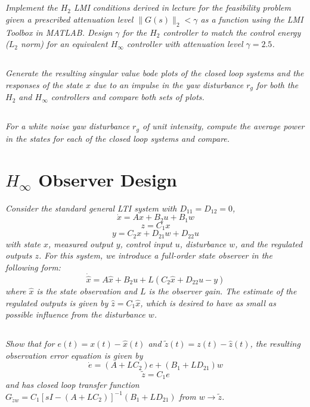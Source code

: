 \documentclass[12pt, letterpaper]{article}
\begin{document}
\subsection{}
\textit{
Implement the $H_2$ LMI conditions derived in lecture for the feasibility problem given a prescribed attenuation level $\|G(s)\|_2 < \gamma$ as a function using the LMI Toolbox in MATLAB. Design $\gamma$ for the $H_2$ controller to match the control energy ($L_2$ norm) for an equivalent $H_\infty$ controller with attenuation level $\gamma = 2.5$.
}

\subsection{}
\textit{
Generate the resulting singular value bode plots of the closed loop systems and the responses of the state $x$ due to an impulse in the yaw disturbance $r_g$ for both the $H_2$ and $H_\infty$ controllers and compare both sets of plots.
}

\subsection{}
\textit{
For a white noise yaw disturbance $r_g$ of unit intensity, compute the average power in the states for each of the closed loop systems and compare.
}

\section{$H_\infty$ Observer Design}
\textit{
Consider the standard general LTI system with $D_{11} = D_{12} = 0$,
\[
\dot{x} = Ax + B_2u + B_1w
\]
\[
z = C_1x
\]
\[
y = C_2x + D_{21}w + D_{22}u
\]
with state $x$, measured output $y$, control input $u$, disturbance $w$, and the regulated outputs $z$. For this system, we introduce a full-order state observer in the following form:
\[
\dot{\hat{x}} = A\hat{x} + B_2u + L(C_2\hat{x} + D_{22}u - y)
\]
where $\hat{x}$ is the state observation and $L$ is the observer gain. The estimate of the regulated outputs is given by $\hat{z} = C_1\hat{x}$, which is desired to have as small as possible influence from the disturbance $w$.
}

\subsection{}
\textit{
Show that for $e(t) = x(t) - \hat{x}(t)$ and $\tilde{z}(t) = z(t) - \hat{z}(t)$, the resulting observation error equation is given by
\[
\dot{e} = (A + LC_2)e + (B_1 + LD_{21})w
\]
\[
\tilde{z} = C_1e
\]
and has closed loop transfer function $G_{\tilde{z}w} = C_1[sI - (A + LC_2)]^{-1}(B_1 + LD_{21})$ from $w \rightarrow \tilde{z}$.
}
\end{document}
